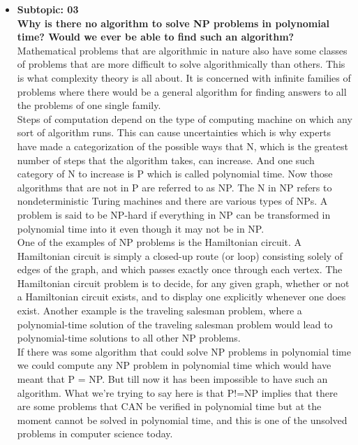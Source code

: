 \documentclass[a4page]{exam}
\newcommand\tab[1][1cm]{\hspace*{#1}}
\begin{document}
\begin{itemize}
    \item \textbf{Subtopic: 03\\ Why is there no algorithm to solve NP problems in polynomial time? Would we ever be able to find such an algorithm?}\\ \tab
    Mathematical problems that are algorithmic in nature also have some classes of problems that are more difficult to solve algorithmically than others. This is what complexity theory is all about. It is concerned with infinite families of problems where there would be a general algorithm for finding answers to all the problems of one single family. \\ \tab 
Steps of computation depend on the type of computing machine on which any sort of algorithm runs. This can cause uncertainties which is why experts have made a categorization of the possible ways that N, which is the greatest number of steps that the algorithm takes, can increase.  And one such category of N to increase is P which is called polynomial time. Now those algorithms that are not in P are referred to as NP. The N in NP refers to nondeterministic Turing machines and there are various types of NPs. A problem is said to be NP-hard if everything in NP can be transformed in polynomial time into it even though it may not be in NP. \\ \tab
One of the examples of NP problems is the Hamiltonian circuit. A Hamiltonian circuit is simply a closed-up route (or loop) consisting solely of edges of the graph, and which passes exactly once through each vertex. The Hamiltonian circuit problem is to decide, for any given graph, whether or not a Hamiltonian circuit exists, and to display one explicitly whenever one does exist. Another example is the traveling salesman problem, where a polynomial-time solution of the traveling salesman problem would lead to polynomial-time solutions to all other NP problems. \\ \tab
If there was some algorithm that could solve NP problems in polynomial time we could compute any NP problem in polynomial time which would have meant that P = NP. 
But till now it has been impossible to have such an algorithm. What we're trying to say here is that P!=NP implies that there are some problems that CAN be verified in polynomial time but at the moment cannot be solved in polynomial time, and this is one of the unsolved problems in computer science today.


\end{itemize}
\end{document}
